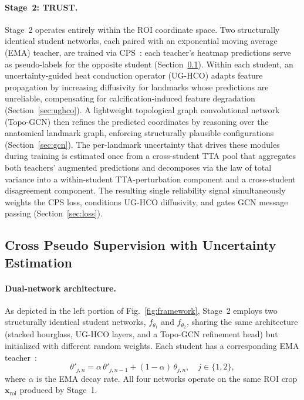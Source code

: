 \documentclass[conference]{IEEEtran}
\begin{document}
\paragraph{Stage~2: TRUST.}
Stage~2 operates entirely within the ROI coordinate space. Two structurally identical student networks, each paired with an exponential moving average (EMA) teacher, are trained via CPS~\cite{Ren2024_g2lcps}: each teacher's heatmap predictions serve as pseudo-labels for the opposite student (Section~\ref{sec:cps}). Within each student, an uncertainty-guided heat conduction operator (UG-HCO) adapts feature propagation by increasing diffusivity for landmarks whose predictions are unreliable, compensating for calcification-induced feature degradation (Section~\ref{sec:ughco}). A lightweight topological graph convolutional network (Topo-GCN) then refines the predicted coordinates by reasoning over the anatomical landmark graph, enforcing structurally plausible configurations (Section~\ref{sec:gcn}). The per-landmark uncertainty that drives these modules during training is estimated once from a cross-student TTA pool that aggregates both teachers' augmented predictions and decomposes via the law of total variance into a within-student TTA-perturbation component and a cross-student disagreement component. The resulting single reliability signal simultaneously weights the CPS loss, conditions UG-HCO diffusivity, and gates GCN message passing (Section~\ref{sec:loss}).

\subsection{Cross Pseudo Supervision with Uncertainty Estimation}
\label{sec:cps}

\paragraph{Dual-network architecture.}
As depicted in the left portion of Fig.~\ref{fig:framework}, Stage~2 employs two structurally identical student networks, $f_{\theta_1}$ and $f_{\theta_2}$, sharing the same architecture (stacked hourglass, UG-HCO layers, and a Topo-GCN refinement head) but initialized with different random weights. Each student has a corresponding EMA teacher~\cite{Tarvainen2017_mean_teacher}:
\begin{equation}
  \theta'_{j,n} = \alpha\,\theta'_{j,n-1} + (1-\alpha)\,\theta_{j,n}, \quad j \in \{1,2\},
  \label{eq:ema}
\end{equation}
where $\alpha$ is the EMA decay rate. All four networks operate on the same ROI crop $\mathbf{x}_{\mathrm{roi}}$ produced by Stage~1.
\end{document}
